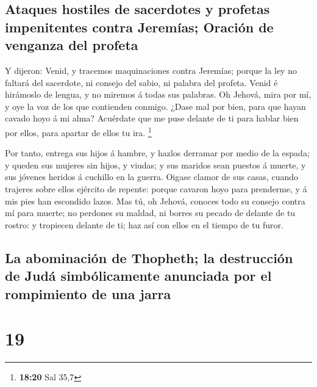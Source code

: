 \hypertarget{ataques-hostiles-de-sacerdotes-y-profetas-impenitentes-contra-jeremuxedas-oraciuxf3n-de-venganza-del-profeta}{%
\subsection{Ataques hostiles de sacerdotes y profetas impenitentes
contra Jeremías; Oración de venganza del
profeta}\label{ataques-hostiles-de-sacerdotes-y-profetas-impenitentes-contra-jeremuxedas-oraciuxf3n-de-venganza-del-profeta}}

 Y dijeron: Venid, y tracemos maquinaciones contra
Jeremías; porque la ley no faltará del sacerdote, ni consejo del sabio,
ni palabra del profeta. Venid é hirámoslo de lengua, y no miremos á
todas sus palabras.  Oh Jehová, mira por mí, y oye la voz
de los que contienden conmigo.  ¿Dase mal por bien, para
que hayan cavado hoyo á mi alma? Acuérdate que me puse delante de ti
para hablar bien por ellos, para apartar de ellos tu ira. \footnote{\textbf{18:20}
  Sal 35,7}

 Por tanto, entrega sus hijos á hambre, y hazlos derramar
por medio de la espada; y queden sus mujeres sin hijos, y viudas; y sus
maridos sean puestos á muerte, y sus jóvenes heridos á cuchillo en la
guerra.  Oigase clamor de sus casas, cuando trajeres sobre
ellos ejército de repente: porque cavaron hoyo para prenderme, y á mis
pies han escondido lazos.  Mas tú, oh Jehová, conoces todo
su consejo contra mí para muerte; no perdones su maldad, ni borres su
pecado de delante de tu rostro: y tropiecen delante de ti; haz así con
ellos en el tiempo de tu furor.

\hypertarget{la-abominaciuxf3n-de-thopheth-la-destrucciuxf3n-de-juduxe1-simbuxf3licamente-anunciada-por-el-rompimiento-de-una-jarra}{%
\subsection{La abominación de Thopheth; la destrucción de Judá
simbólicamente anunciada por el rompimiento de una
jarra}\label{la-abominaciuxf3n-de-thopheth-la-destrucciuxf3n-de-juduxe1-simbuxf3licamente-anunciada-por-el-rompimiento-de-una-jarra}}

\hypertarget{section-18}{%
\section{19}\label{section-18}}

